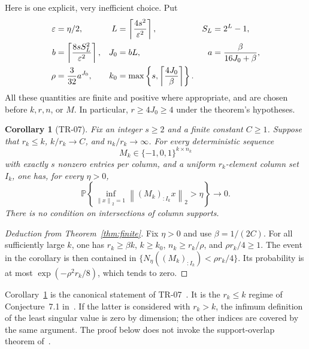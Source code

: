 \documentclass[11pt,a4paper]{article}
\newtheorem{corollary}[theorem]{Corollary}
\theoremstyle{remark}\newtheorem{remark}[theorem]{Remark}
\newcommand{\Prob}{\mathbb P}
\newcommand{\norm}[1]{\left\lVert #1\right\rVert}
\begin{document}
Here is one explicit, very inefficient choice. Put
\begin{align}
 \varepsilon&=\eta/2,&
 L&=\left\lceil\frac{4s^2}{\varepsilon^2}\right\rceil,&
 S_L&=2^L-1,\notag\\
 b&=\left\lceil\frac{8sS_L^2}{\varepsilon^2}\right\rceil,&
 J_0&=bL,&
 a&=\frac{\beta}{16J_0+\beta},\label{eq:constants}\\
 \rho&=\frac{3}{32}a^{J_0},&
 k_0&=\max\left\{s,\left\lceil\frac{4J_0}{\beta}\right\rceil\right\}.\notag
\end{align}
All these quantities are finite and positive where appropriate, and are chosen before $k,r,n$, or $M$. In particular, $r\ge4J_0\ge4$ under the theorem's hypotheses.

\begin{corollary}[TR-07]\label{cor:target}
Fix an integer $s\ge2$ and a finite constant $C\ge1$. Suppose that $r_k\le k$, $k/r_k\to C$, and $n_k/r_k\to\infty$. For every deterministic sequence
\[
 M_k\in\{-1,0,1\}^{k\times n_k}
\]
with exactly $s$ nonzero entries per column, and a uniform $r_k$-element column set $I_k$, one has, for every $\eta>0$,
\[
 \Prob\left\{\inf_{\norm{x}_2=1}\norm{(M_k)_{:I_k}x}_2>\eta\right\}\longrightarrow0.
\]
There is no condition on intersections of column supports.
\end{corollary}
\begin{proof}[Deduction from Theorem~\ref{thm:finite}]
Fix $\eta>0$ and use $\beta=1/(2C)$. For all sufficiently large $k$, one has $r_k\ge\beta k$, $k\ge k_0$, $n_k\ge r_k/\rho$, and $\rho r_k/4\ge1$. The event in the corollary is then contained in $\{N_\eta((M_k)_{:I_k})<\rho r_k/4\}$. Its probability is at most $\exp(-\rho^2r_k/8)$, which tends to zero.
\end{proof}

Corollary~\ref{cor:target} is the canonical statement of TR-07~\cite{Townsend}. It is the $r_k\le k$ regime of Conjecture~7.1 in~\cite{HRT}. If the latter is considered with $r_k>k$, the infimum definition of the least singular value is zero by dimension; the other indices are covered by the same argument. The proof below does not invoke the support-overlap theorem of~\cite{HRT}.
\end{document}
